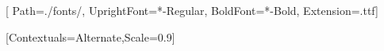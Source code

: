 

\newfontfamily{}[
Path=./fonts/,
UprightFont=*-Regular,
BoldFont=*-Bold,
Extension=.ttf]

\newfontface{}
\newfontface{}

\setmonofont{JuliaMono-Light}[Contextuals=Alternate,Scale=0.9]




